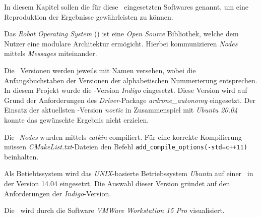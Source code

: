 
In diesem Kapitel sollen die für diese \Arbeit\ eingesetzten Softwares genannt, um eine Reproduktion der Ergebnisse gewährleisten zu können.




Das \textit{Robot Operating System} (\ROS) ist eine \textit{Open Source} Bibliothek, welche dem Nutzer eine modulare Architektur ermögicht.
Hierbei kommunizieren \textit{Nodes} mittels \textit{Messages} miteinander.

Die \ROS\ Versionen werden jeweils mit Namen versehen, wobei die Anfangsbuchstaben der Versionen der alphabetischen Nummerierung entsprechen. In diesem Projekt wurde die \ROS-Version \textit{Indigo} eingesetzt.
Diese Version wird auf Grund der Anforderungen des \textit{Driver}-Package \textit{ardrone\_autonomy} eingesetzt. Der Einsatz der aktuellsten \ROS-Version \textit{noetic} in Zusammenspiel mit \textit{Ubuntu 20.04} konnte das gewünschte Ergebnis nicht erzielen.

Die \ROS\textit{-Nodes} wurden mittels \textit{catkin} compiliert.
Für eine korrekte Kompilierung müssen \textit{CMakeList.txt}-Dateien den Befehl \texttt{add\_compile\_options(-std=c++11)} beinhalten.


Als Betiebtssystem wird das \textit{UNIX}-basierte Betriebssystem \textit{Ubuntu} auf einer \VM\ in der Version 14.04 eingesetzt.
Die Auswahl dieser Version gründet auf den Anforderungen der \ROS \textit{Indigo}-Version.

Die \VM\ wird durch die Software \textit{VMWare Workstation 15 Pro} visualisiert.


\missing\










